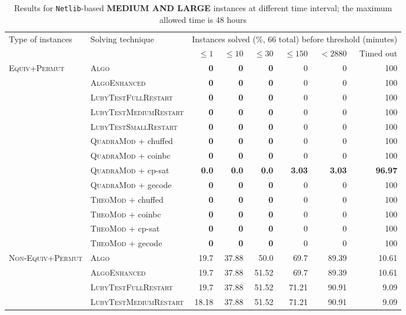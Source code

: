 \documentclass{book}
\begin{document}
\begin{table}[]\scriptsize\centering
\caption{Results for \texttt{Netlib}-based {\bf MEDIUM AND LARGE } instances at different time interval; the maximum allowed time is 48 hours}
\begin{tabular}{@{}ll rr rr rr@{}}\toprule Type of instances & Solving technique  & \multicolumn{6}{c}{Instances solved (\%, 66 total) before threshold (minutes)}\\\cmidrule(l){3-8}&  &  $\leq 1$ &  $\leq 10$ &  $\leq 30$ &  $\leq 150$ &  $ < 2880$ & Timed out\\
\midrule
\multirow{10}{*}{\textsc{Equiv+Permut}} & \textsc{Algo}   & \bf 0 & \bf 0 & \bf 0 & 0 & 0 & 100 \\
& \textsc{AlgoEnhanced}   & \bf 0 & \bf 0 & \bf 0 & 0 & 0 & 100 \\
& \textsc{LubyTestFullRestart}   & \bf 0 & \bf 0 & \bf 0 & 0 & 0 & 100 \\
& \textsc{LubyTestMediumRestart}   & \bf 0 & \bf 0 & \bf 0 & 0 & 0 & 100 \\
& \textsc{LubyTestSmallRestart}   & \bf 0 & \bf 0 & \bf 0 & 0 & 0 & 100 \\
& \textsc{QuadraMod} + chuffed   & \bf 0 & \bf 0 & \bf 0 & 0 & 0 & 100 \\
& \textsc{QuadraMod} + coinbc   & \bf 0 & \bf 0 & \bf 0 & 0 & 0 & 100 \\
& \textsc{QuadraMod} + cp-sat   & \bf 0.0 & \bf 0.0 & \bf 0.0 & \bf 3.03 & \bf 3.03 &  \bf 96.97 \\
& \textsc{QuadraMod} + gecode   & \bf 0 & \bf 0 & \bf 0 & 0 & 0 & 100 \\
& \textsc{TheoMod} + chuffed   & \bf 0 & \bf 0 & \bf 0 & 0 & 0 & 100 \\
& \textsc{TheoMod} + coinbc   & \bf 0 & \bf 0 & \bf 0 & 0 & 0 & 100 \\
& \textsc{TheoMod} + cp-sat   & \bf 0 & \bf 0 & \bf 0 & 0 & 0 & 100 \\
& \textsc{TheoMod} + gecode   & \bf 0 & \bf 0 & \bf 0 & 0 & 0 & 100 \\
\midrule\multirow{10}{*}{\textsc{Non-Equiv+Permut}} & \textsc{Algo}   & 19.7 & 37.88 & 50.0 & 69.7 & 89.39 & 10.61 \\
& \textsc{AlgoEnhanced}   & 19.7 & 37.88 & 51.52 & 69.7 & 89.39 & 10.61 \\
& \textsc{LubyTestFullRestart}   & 19.7 & 37.88 & 51.52 & 71.21 & 90.91 & 9.09 \\
& \textsc{LubyTestMediumRestart}   & 18.18 & 37.88 & 51.52 & 71.21 & 90.91 & 9.09 \\

\end{tabular}
\end{table}
\end{document}
